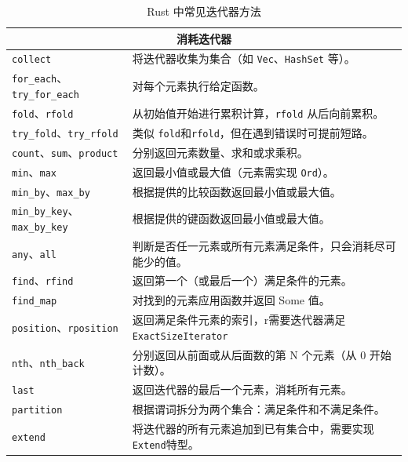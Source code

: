 \begin{table}[ht]
\begin{tabular}{|l|l|}
		\hline
		\multicolumn{2}{|c|}{\textbf{消耗迭代器}}                                                  \\
		\hline
		\verb|collect|                         & 将迭代器收集为集合（如 \verb|Vec|、\verb|HashSet| 等）。    \\
		\verb|for_each|、\verb|try_for_each|    & 对每个元素执行给定函数。                                 \\
		\verb|fold|、\verb|rfold|               & 从初始值开始进行累积计算，\verb|rfold| 从后向前累积。            \\
		\verb|try_fold|、\verb|try_rfold|       & 类似 \verb|fold|和\verb|rfold|，但在遇到错误时可提前短路。    \\
		\verb|count|、\verb|sum|、\verb|product| & 分别返回元素数量、求和或求乘积。                             \\
		\verb|min|、\verb|max|                  & 返回最小值或最大值（元素需实现 \verb|Ord|）。                 \\
		\verb|min_by|、\verb|max_by|            & 根据提供的比较函数返回最小值或最大值。                          \\
		\verb|min_by_key|、\verb|max_by_key|    & 根据提供的键函数返回最小值或最大值。                           \\
		\verb|any|、\verb|all|                  & 判断是否任一元素或所有元素满足条件，只会消耗尽可能少的值。                \\
		\verb|find|、\verb|rfind|               & 返回第一个（或最后一个）满足条件的元素。                         \\
		\verb|find_map|                        & 对找到的元素应用函数并返回 Some 值。                        \\
		\verb|position|、\verb|rposition|       & 返回满足条件元素的索引，r需要迭代器满足\verb|ExactSizeIterator| \\
		\verb|nth|、\verb|nth_back|             & 分别返回从前面或从后面数的第 N 个元素（从 0 开始计数）。              \\
		\verb|last|                            & 返回迭代器的最后一个元素，消耗所有元素。                         \\
		\verb|partition|                       & 根据谓词拆分为两个集合：满足条件和不满足条件。                      \\
		\verb|extend|                          & 将迭代器的所有元素追加到已有集合中，需要实现\verb|Extend|特型。       \\
		\hline
	\end{tabular}
	\caption{Rust 中常见迭代器方法}
\end{table}
